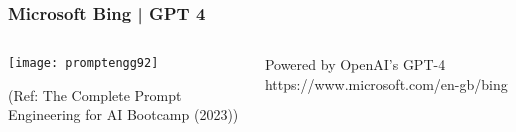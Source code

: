 
		


\begin{frame}[fragile]\frametitle{Microsoft Bing | GPT 4}


\begin{columns}
    \begin{column}[T]{0.6\linewidth}
		\begin{center}
		\texttt{[image: promptengg92]}

		{\tiny (Ref: The Complete Prompt Engineering for AI Bootcamp (2023))}
		\end{center}	
    \end{column}
    \begin{column}[T]{0.4\linewidth}
		Powered by OpenAI’s GPT-4
		https://www.microsoft.com/en-gb/bing
    \end{column}
  \end{columns}
\end{frame}





